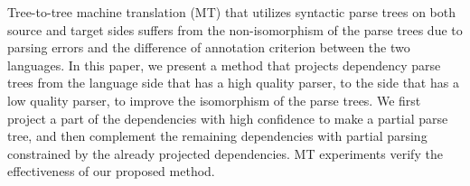 Tree-to-tree machine translation (MT) that utilizes syntactic parse trees on both source and target sides suffers from the non-isomorphism of the parse trees due to parsing errors and the difference of annotation criterion between the two languages. In this paper, we present a method that projects dependency parse trees from the language side that has a high quality parser, to the side that has a low quality parser, to improve the isomorphism of the parse trees. We first project a part of the dependencies with high confidence to make a partial parse tree, and then complement the remaining dependencies with partial parsing constrained by the already projected dependencies. MT experiments verify the effectiveness of our proposed method.
